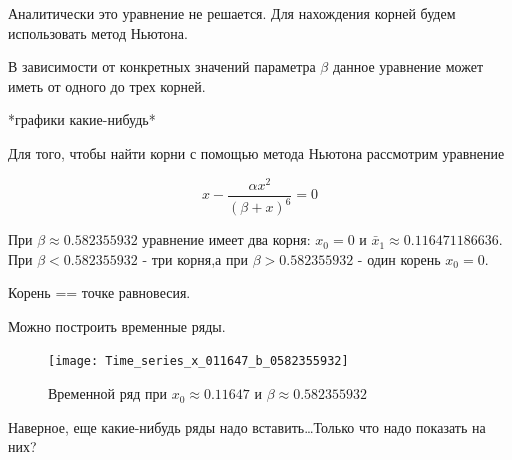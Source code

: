         Аналитически это уравнение не решается. Для нахождения корней будем использовать метод Ньютона.

        В зависимости от конкретных значений параметра \(\beta\) данное уравнение может иметь от одного до трех корней.
    
        *графики какие-нибудь*

        Для того, чтобы найти корни с помощью метода Ньютона рассмотрим уравнение 
    
        \[x - \frac{\alpha x^2}{(\beta + x)^6} = 0\]

        При \(\beta \approx 0.582355932\) уравнение имеет два корня: \(x_0 = 0\) и \(\bar{x}_1 \approx 0.116471186636\). При \(\beta < 0.582355932\) - три корня,а при \(\beta > 0.582355932\) - один корень \(x_0 = 0\).
    
        Корень == точке равновесия.

        Можно построить временные ряды.

        \begin{figure}[h]
            \texttt{[image: Time\_series\_x\_011647\_b\_0582355932]}    
            \caption{Временной ряд при \(x_0 \approx 0.11647\) и \(\beta \approx 0.582355932\)}
        \end{figure}

        Наверное, еще какие-нибудь ряды надо вставить\dots Только что надо показать на них?
